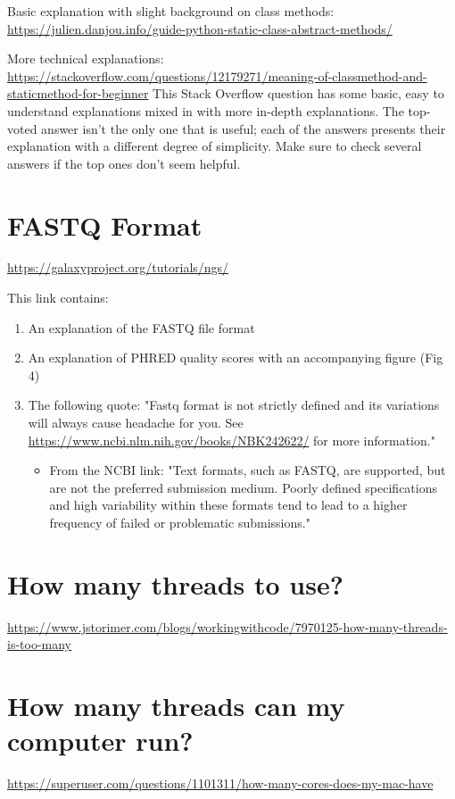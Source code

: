 \begin{fullpage}
    Basic explanation with slight background on class methods: 
    \newline
    \url{https://julien.danjou.info/guide-python-static-class-abstract-methods/}

    More technical explanations: 
    \newline
    \url{https://stackoverflow.com/questions/12179271/meaning-of-classmethod-and-staticmethod-for-beginner}
    This Stack Overflow question has some basic, easy to understand explanations mixed in with more in-depth explanations. The top-voted answer isn't the only one that is useful; each of the answers presents their explanation with a different degree of simplicity. Make sure to check several answers if the top ones don't seem helpful. 
    
    
    \section{FASTQ Format}
    \label{app:fastq-format}
    \url{https://galaxyproject.org/tutorials/ngs/}
    
    This link contains:
    \begin{enumerate}
    \item An explanation of the FASTQ file format
    \item An explanation of PHRED quality scores with an accompanying figure (Fig 4)
    \item The following quote: "Fastq format is not strictly defined and its variations will always cause headache for you. See \url{https://www.ncbi.nlm.nih.gov/books/NBK242622/} for more information."
        \begin{itemize}
        \item From the NCBI link: "Text formats, such as FASTQ, are supported, but are not the preferred submission medium. Poorly defined specifications and high variability within these formats tend to lead to a higher frequency of failed or problematic submissions."
        \end{itemize}    
    \end{enumerate}
    
    
    \section{How many threads to use?}
    \label{app:threads}
    \url{https://www.jstorimer.com/blogs/workingwithcode/7970125-how-many-threads-is-too-many}
    
    
    \section{How many threads can my computer run?}
    \label{app:threads-resources}
    \url{https://superuser.com/questions/1101311/how-many-cores-does-my-mac-have}



\end{fullpage}
